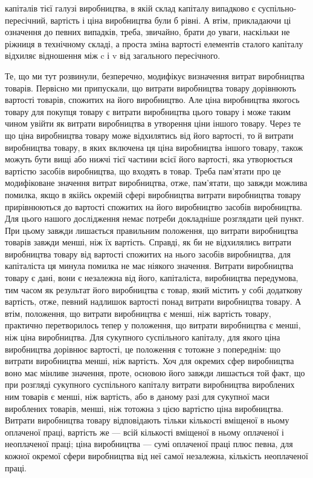 \parcont{}  %
капіталів тієї галузі виробництва, в якій склад капіталу випадково є суспільно-пересічний, вартість
і ціна виробництва були б
рівні. А втім, прикладаючи ці означення до певних випадків,
треба, звичайно, брати до уваги, наскільки не ріжниця в технічному складі, а проста зміна вартості
елементів сталого капіталу
відхиляє відношення між c і v від загального пересічного.

Те, що ми тут розвинули, безперечно, модифікує визначення
витрат виробництва товарів. Первісно ми припускали, що витрати виробництва товару дорівнюють
вартості товарів, спожитих на його виробництво. Але ціна виробництва якогось товару для покупця
товару є витрати виробництва цього товару
і може таким чином увійти як витрати виробництва в утворення
ціни іншого товару. Через те що ціна виробництва товару може
відхилятись від його вартості, то й витрати виробництва товару,
в яких включена ця ціна виробництва іншого товару, також
можуть бути вищі або нижчі тієї частини всієї його вартості,
яка утворюється вартістю засобів виробництва, що входять в
товар. Треба пам’ятати про це модифіковане значення витрат
виробництва, отже, пам’ятати, що завжди можлива помилка,
якщо в якійсь окремій сфері виробництва витрати виробництва товару прирівнюються до вартості
спожитих на його виробництво
засобів виробництва. Для цього нашого дослідження немає потреби докладніше розглядати цей пункт. При
цьому завжди лишається правильним положення, що витрати виробництва товарів
завжди менші, ніж їх вартість. Справді, як би не відхилялись
витрати виробництва товару від вартості спожитих на нього
засобів виробництва, для капіталіста ця минула помилка не має
ніякого значення. Витрати виробництва товару є дані, вони є
незалежна від його, капіталіста, виробництва передумова, тим часом як результат його виробництва є
товар, який містить у
собі додаткову вартість, отже, певний надлишок вартості понад
витрати виробництва товару. А втім, положення, що витрати
виробництва є менші, ніж вартість товару, практично перетворилось тепер у положення, що витрати
виробництва є менші,
ніж ціна виробництва. Для сукупного суспільного капіталу, для
якого ціна виробництва дорівнює вартості, це положення є
тотожне з попереднім: що витрати виробництва менші, ніж вартість. Хоч для окремих сфер виробництва
воно має мінливе значення, проте, основою його завжди лишається той факт, що при розгляді сукупного
суспільного капіталу витрати виробництва
вироблених ним товарів є менші, ніж вартість, або в даному разі
для сукупної маси вироблених товарів, менші, ніж тотожна з цією
вартістю ціна виробництва. Витрати виробництва товару відповідають тільки кількості вміщеної в ньому
оплаченої праці,
вартість же — всій кількості вміщеної в ньому оплаченої і неоплаченої праці; ціна виробництва — сумі
оплаченої праці плюс
певна, для кожної окремої сфери виробництва від неї самої незалежна, кількість неоплаченої праці.
